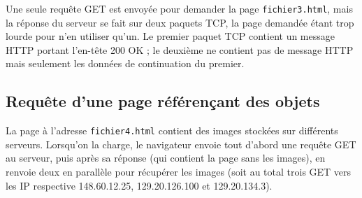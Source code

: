 \documentclass[a4paper]{article}
\begin{document}
Une seule requête GET est envoyée pour demander la page \verb?fichier3.html?, mais la réponse du serveur se fait sur deux paquets TCP, la page demandée étant trop lourde pour n'en utiliser qu'un. Le premier paquet TCP contient un message HTTP portant l'en-tête 200 OK ; le deuxième ne contient pas de message HTTP mais seulement les données de continuation du premier.

\subsection*{Requête d'une page référençant des objets}

La page à l'adresse \verb?fichier4.html? contient des images stockées sur différents serveurs. Lorsqu'on la charge, le navigateur envoie tout d'abord une requête GET au serveur, puis après sa réponse (qui contient la page sans les images), en renvoie deux en parallèle pour récupérer les images (soit au total trois GET vers les IP respective 148.60.12.25, 129.20.126.100 et 129.20.134.3).
\end{document}
